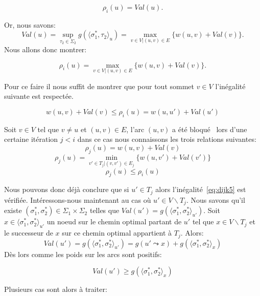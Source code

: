 \begin{enumerate}
$$ \rho_i(u) = Val(u) .$$

Or, nous savons: 
$$ Val(u) = \sup _{\tau_2 \in \Sigma_2 } g( \langle \sigma^*_1, \tau_2 \rangle_u) = \max_{v \in V | (u,v) \in E} \{ w(u,v) + Val(v) \} .$$
Nous allons donc montrer:

\begin{equation*}
	\rho_i(u) = \max_{v \in V | (u,v) \in E} \{ w(u,v) + Val(v) \}.
\end{equation*}

Pour ce faire il nous suffit de montrer que pour tout sommet $v \in V$ l'inégalité suivante est respectée.

\begin{equation}
	\label{eq:dijk5}
	w(u,v) + Val(v) \leq \rho_i(u) = w(u,u') + Val(u') 
\end{equation}

Soit $v \in V$ tel que $v \neq u$ et $(u,v) \in E$, l'arc $(u,v)$ a été \og bloqué \fg~lors d'une certaine itération $j < i $ dans ce cas nous connaissons les trois relations suivantes:
\begin{equation} \label{eq:dijk6}
	  \rho_j(u) = w(u,v) + Val(v) 
	\end{equation}
\begin{equation*}  \rho_j(u) = \min_{v' \in T_j |(v,v') \in E_j} \{ w(u,v') + Val(v') \} \end{equation*}
\begin{equation*} \rho_j(u) \leq \rho_i(u) \end{equation*}
	
Nous pouvons donc déjà conclure que si $u' \in T_j$ alors l'inégalité~\eqref{eq:dijk5} est vérifiée.
Intéressons-nous maintenant au cas où $u' \in V \backslash T_j$. Nous savons qu'il existe $(\sigma_1^*, \sigma_2^*) \in \Sigma_1 \times \Sigma_2$ telles que $Val(u') = g( \langle \sigma_1^*, \sigma_2^* \rangle_{u'})$. 
Soit $x \in \langle \sigma_1^*, \sigma_2^* \rangle_{u'}$ un noeud sur le chemin optimal partant de $u'$ tel que $x \in V\backslash T_j$ et le successeur de $x$ sur ce chemin optimal appartient à $T_j$.
Alors:
$$ Val(u') = g( \langle \sigma_1^*, \sigma_2^* \rangle_{u'}) = g(u' \leadsto x) + g( \langle \sigma_1^*, \sigma_2^* \rangle_{x}) $$
Dès lors comme les poids sur les arcs sont positifs:

\begin{equation*}
	Val(u') \geq g( \langle \sigma_1^*, \sigma_2^* \rangle_{x})
\end{equation*}

Plusieurs cas sont alors à traiter:


\end{enumerate}
